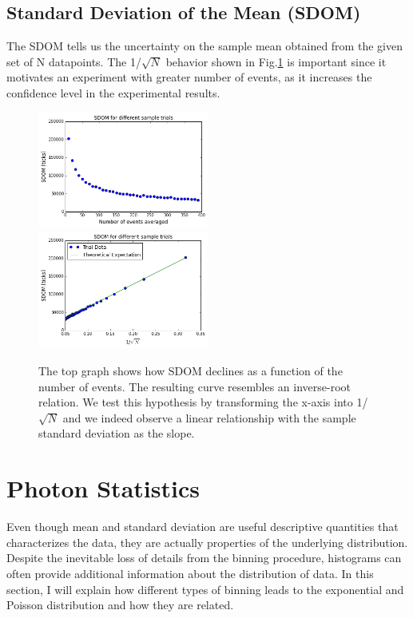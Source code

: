 \documentclass[authoryear, 12pt,5p, times]{elsarticle}
\begin{document}
	\subsection{Standard Deviation of the Mean (SDOM)}
		The SDOM tells us the uncertainty on the sample mean obtained from the given set of N datapoints. The 1/$\sqrt{N}$ behavior shown in Fig.\ref{sdom} is important since it motivates an experiment with greater number of events, as it increases the confidence level in the experimental results.
	 	\begin{figure}[ht]
		\includegraphics[width=0.5\textwidth]{figures/sdom_exp_graph}
		\includegraphics[width=0.5\textwidth]{figures/sdom_linear}
		\caption{The top graph shows how SDOM declines as a function of the number of events. The resulting curve resembles an inverse-root relation. We test this hypothesis by transforming the x-axis into 1/$\sqrt{N}$ and we indeed observe a linear relationship with the sample standard deviation as the slope.}
		\label{sdom}
	\end{figure}
\section{Photon Statistics\label{pstats}}
Even though mean and standard deviation are useful descriptive quantities that characterizes the data, they are actually properties of the underlying distribution. Despite the inevitable loss of details from the binning procedure, histograms can often provide additional information about the distribution of data. In this section, I will explain how different types of binning leads to the exponential and Poisson distribution and how they are related. 
\end{document}
